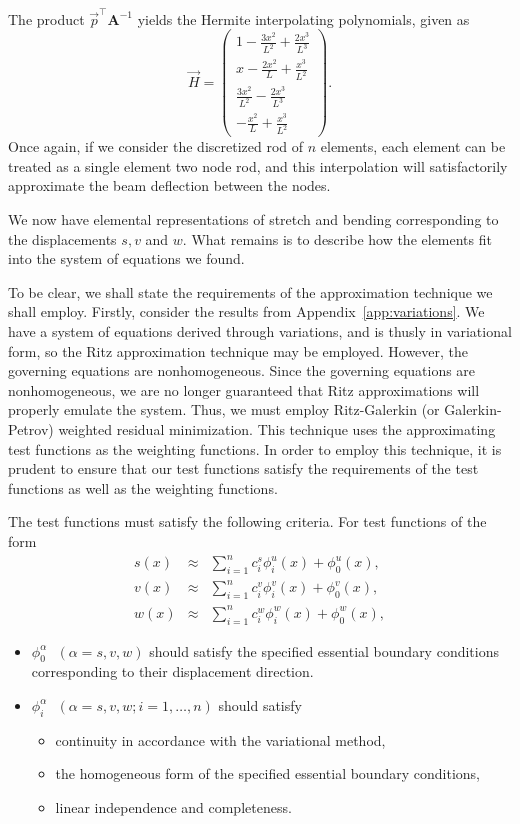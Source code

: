The product $\vec{p}^\top\mathbf{A}^{-1}$ yields the Hermite interpolating polynomials, given as
\begin{equation}
\vec{H} = 
\begin{pmatrix}
1 - \frac{3x^2}{L^2} + \frac{2x^3}{L^3} \\
x - \frac{2x^2}{L} + \frac{x^3}{L^2} \\
\frac{3x^2}{L^2} - \frac{2x^3}{L^3} \\
-\frac{x^2}{L} + \frac{x^3}{L^2}
\end{pmatrix}.
\label{eq:bending.hermitian.vector}
\end{equation}
Once again, if we consider the discretized rod of $n$ elements, each element can be treated as a single element two node rod, and this interpolation will satisfactorily approximate the beam deflection between the nodes. 

We now have elemental representations of stretch and bending corresponding to the displacements $s,v$ and $w$. What remains is to describe how the elements fit into the system of equations we found.

To be clear, we shall state the requirements of the approximation technique we shall employ. Firstly, consider the results from Appendix~\ref{app:variations}. We have a system of equations derived through variations, and is thusly in variational form, so the Ritz approximation technique may be employed. However, the governing equations are nonhomogeneous. Since the governing equations are nonhomogeneous, we are no longer guaranteed that Ritz approximations will properly emulate the system. Thus, we must employ Ritz-Galerkin (or Galerkin-Petrov) weighted residual minimization. This technique uses the approximating test functions as the weighting functions. In order to employ this technique, it is prudent to ensure that our test functions satisfy the requirements of the test functions as well as the weighting functions.

The test functions must satisfy the following criteria.
For test functions of the form
\begin{eqnarray}
s(x) &\approx& \sum_{i=1}^nc_i^s\phi_i^u(x) + \phi_0^u(x), \\
v(x) &\approx& \sum_{i=1}^nc_i^v\phi_i^v(x) + \phi_0^v(x), \\
w(x) &\approx& \sum_{i=1}^nc_i^w\phi_i^w(x) + \phi_0^w(x),
\end{eqnarray}
\begin{itemize}
\item $\phi_0^\alpha \text{ } (\alpha = s,v,w)$ should satisfy the specified essential boundary conditions corresponding to their displacement direction.
\item $\phi_i^\alpha \text{ } (\alpha = s,v,w; i = 1,\dots,n)$ should satisfy 
\begin{itemize}
\item continuity in accordance with the variational method,
\item the homogeneous form of the specified essential boundary conditions,
\item linear independence and completeness.
\end{itemize}
\end{itemize}

